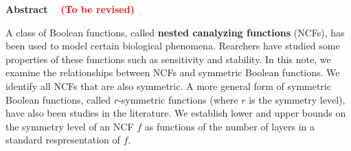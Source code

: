 \vspace*{-0.05in}
\begin{center}
\textbf{Abstract}~~ \textcolor{red}{\textbf{(To be revised)}}
\end{center}

\smallskip

A class of Boolean functions, 
called \textbf{nested canalyzing functions} (NCFs),
has been used to model certain biological phenomena.
Rearchers have studied some properties of these functions
such as sensitivity and stability.
In this note, we examine the relationships between NCFs and symmetric 
Boolean functions. 
We identify all NCFs that are also symmetric. 
A more general form of symmetric Boolean functions,
called $r$-symmetric functions (where $r$ is the symmetry level),
have also been studies in the literature.
We establish lower and upper bounds on the symmetry
level of an NCF $f$ as functions of the number of layers
in a standard respresentation of $f$.  



